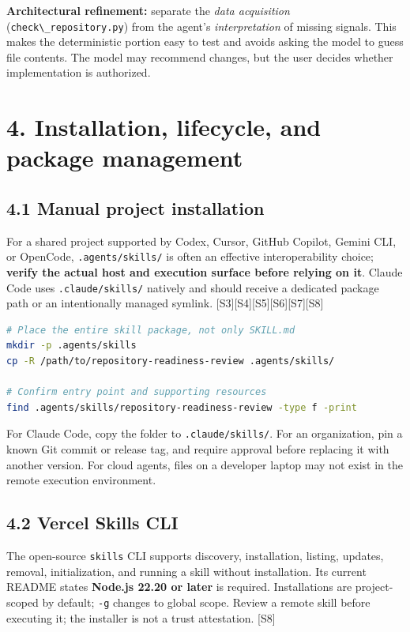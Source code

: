 \documentclass[
  10pt,
  letterpaper,
]{article}
\newcommand{\passthrough}[1]{#1}
\begin{document}
\textbf{Architectural refinement:} separate the \emph{data acquisition}
(\passthrough{\lstinline!check\_repository.py!}) from the agent's
\emph{interpretation} of missing signals. This makes the deterministic
portion easy to test and avoids asking the model to guess file contents.
The model may recommend changes, but the user decides whether
implementation is authorized.

\section{4. Installation, lifecycle, and package
management}\label{installation-lifecycle-and-package-management}

\subsection{4.1 Manual project
installation}\label{manual-project-installation}

For a shared project supported by Codex, Cursor, GitHub Copilot, Gemini
CLI, or OpenCode, \passthrough{\lstinline!.agents/skills/!} is often an
effective interoperability choice; \textbf{verify the actual host and
execution surface before relying on it}. Claude Code uses
\passthrough{\lstinline!.claude/skills/!} natively and should receive a
dedicated package path or an intentionally managed symlink.
{[}S3{]}{[}S4{]}{[}S5{]}{[}S6{]}{[}S7{]}{[}S8{]}

\begin{lstlisting}[language=bash]
# Place the entire skill package, not only SKILL.md
mkdir -p .agents/skills
cp -R /path/to/repository-readiness-review .agents/skills/

# Confirm entry point and supporting resources
find .agents/skills/repository-readiness-review -type f -print
\end{lstlisting}

For Claude Code, copy the folder to
\passthrough{\lstinline!.claude/skills/!}. For an organization, pin a
known Git commit or release tag, and require approval before replacing
it with another version. For cloud agents, files on a developer laptop
may not exist in the remote execution environment.

\subsection{4.2 Vercel Skills CLI}\label{vercel-skills-cli}

The open-source \passthrough{\lstinline!skills!} CLI supports discovery,
installation, listing, updates, removal, initialization, and running a
skill without installation. Its current README states \textbf{Node.js
22.20 or later} is required. Installations are project-scoped by
default; \passthrough{\lstinline!-g!} changes to global scope. Review a
remote skill before executing it; the installer is not a trust
attestation. {[}S8{]}
\end{document}
